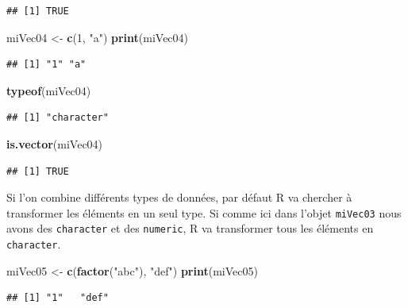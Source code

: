 \documentclass[]{book}
\newenvironment{Shaded}{\begin{snugshade}}{\end{snugshade}}
\newcommand{\KeywordTok}[1]{\textcolor[rgb]{0.13,0.29,0.53}{\textbf{#1}}}
\newcommand{\DecValTok}[1]{\textcolor[rgb]{0.00,0.00,0.81}{#1}}
\newcommand{\StringTok}[1]{\textcolor[rgb]{0.31,0.60,0.02}{#1}}
\newcommand{\NormalTok}[1]{#1}
\begin{document}
\begin{verbatim}
## [1] TRUE
\end{verbatim}

\begin{Shaded}
\begin{Highlighting}[]
\NormalTok{miVec04 <-}\StringTok{ }\KeywordTok{c}\NormalTok{(}\DecValTok{1}\NormalTok{, }\StringTok{"a"}\NormalTok{)}
\KeywordTok{print}\NormalTok{(miVec04)}
\end{Highlighting}
\end{Shaded}

\begin{verbatim}
## [1] "1" "a"
\end{verbatim}

\begin{Shaded}
\begin{Highlighting}[]
\KeywordTok{typeof}\NormalTok{(miVec04)}
\end{Highlighting}
\end{Shaded}

\begin{verbatim}
## [1] "character"
\end{verbatim}

\begin{Shaded}
\begin{Highlighting}[]
\KeywordTok{is.vector}\NormalTok{(miVec04)}
\end{Highlighting}
\end{Shaded}

\begin{verbatim}
## [1] TRUE
\end{verbatim}

Si l'on combine différents types de données, par défaut R va chercher à
transformer les éléments en un seul type. Si comme ici dans l'objet
\texttt{miVec03} nous avons des \texttt{character} et des
\texttt{numeric}, R va transformer tous les éléments en
\texttt{character}.

\begin{Shaded}
\begin{Highlighting}[]
\NormalTok{miVec05 <-}\StringTok{ }\KeywordTok{c}\NormalTok{(}\KeywordTok{factor}\NormalTok{(}\StringTok{"abc"}\NormalTok{), }\StringTok{"def"}\NormalTok{)}
\KeywordTok{print}\NormalTok{(miVec05)}
\end{Highlighting}
\end{Shaded}

\begin{verbatim}
## [1] "1"   "def"
\end{verbatim}
\end{document}

